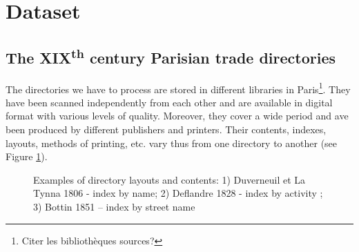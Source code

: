 \section{Dataset}


\subsection{The  XIX\textsuperscript{th} century Parisian trade directories}

The directories we have to process are stored in different libraries in Paris\footnote{Citer les bibliothèques sources?}. They have been scanned independently from each other and are available in digital format with various levels of quality. Moreover, they cover a wide period and ave been produced by different publishers and printers. Their contents, indexes, layouts, methods of printing, etc. vary thus from one directory to another (see Figure \ref{fig:directories}).


\begin{figure}[htb!]
	  \caption{\label{fig:directories} Examples of directory layouts and contents: 1) Duverneuil et La Tynna 1806 - index by name; 2) Deflandre 1828 - index by activity ; 3) Bottin 1851 –  index by street name}
\end{figure}


